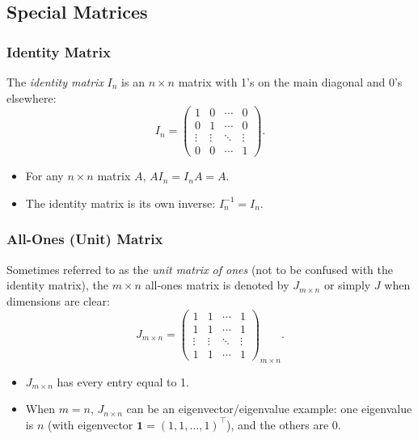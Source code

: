 \subsection{Special Matrices}
\subsubsection{Identity Matrix}
The \emph{identity matrix} $I_n$ is an $n \times n$ matrix with 1's on the main diagonal and 0's elsewhere:
\[
I_n = 
\begin{pmatrix}
1 & 0 & \cdots & 0 \\
0 & 1 & \cdots & 0 \\
\vdots & \vdots & \ddots & \vdots \\
0 & 0 & \cdots & 1
\end{pmatrix}.
\]
\begin{itemize}
    \item For any $n \times n$ matrix $A$, $A I_n = I_n A = A$.
    \item The identity matrix is its own inverse: $I_n^{-1} = I_n$.
\end{itemize}




\subsubsection{All-Ones (Unit) Matrix}
Sometimes referred to as the \emph{unit matrix of ones} (not to be confused with the identity matrix), 
the $m \times n$ all-ones matrix is denoted by $J_{m \times n}$ or simply $J$ when dimensions are clear:
\[
J_{m \times n} = 
\begin{pmatrix}
1 & 1 & \cdots & 1 \\
1 & 1 & \cdots & 1 \\
\vdots & \vdots & \ddots & \vdots \\
1 & 1 & \cdots & 1
\end{pmatrix}_{m \times n}.
\]
\begin{itemize}
    \item $J_{m \times n}$ has every entry equal to 1.
    \item When $m = n$, $J_{n \times n}$ can be an eigenvector/eigenvalue example: 
          one eigenvalue is $n$ (with eigenvector $\mathbf{1} = (1,1,\dots,1)^\top$), 
          and the others are 0.
\end{itemize}

